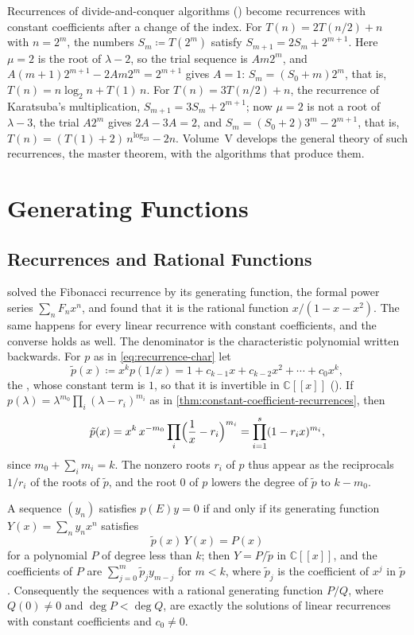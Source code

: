 Recurrences of divide-and-conquer algorithms () become recurrences with constant coefficients after a change of the index. For $T(n)=2T(n/2)+n$ with $n=2^m$, the numbers $S_m\coloneqq T(2^m)$ satisfy $S_{m+1}=2S_m+2^{m+1}$. Here $\mu=2$ is the root of $\lambda-2$, so the trial sequence is $Am2^m$, and $A(m+1)2^{m+1}-2Am2^m=2^{m+1}$ gives $A=1$: $S_m=(S_0+m)2^m$, that is, $T(n)=n\log_2n+T(1)\,n$. For $T(n)=3T(n/2)+n$, the recurrence of Karatsuba's multiplication, $S_{m+1}=3S_m+2^{m+1}$; now $\mu=2$ is not a root of $\lambda-3$, the trial $A2^m$ gives $2A-3A=2$, and $S_m=(S_0+2)3^m-2^{m+1}$, that is, $T(n)=(T(1)+2)\,n^{\log_23}-2n$. Volume~V develops the general theory of such recurrences, the master theorem, with the algorithms that produce them.

\section{Generating Functions}
\label{sec:recurrence-gf}

\subsection{Recurrences and Rational Functions}

 solved the Fibonacci recurrence by its generating function, the formal power series $\sum_nF_nx^n$, and found that it is the rational function $x/(1-x-x^2)$. The same happens for every linear recurrence with constant coefficients, and the converse holds as well. The denominator is the characteristic polynomial written backwards. For $p$ as in \eqref{eq:recurrence-char} let
\[
\tilde p(x)\coloneqq x^kp(1/x)=1+c_{k-1}x+c_{k-2}x^2+\cdots+c_0x^k ,
\]
the , whose constant term is $1$, so that it is invertible in $\mathbb C[[x]]$ (). If $p(\lambda)=\lambda^{m_0}\prod_i(\lambda-r_i)^{m_i}$ as in \cref{thm:constant-coefficient-recurrences}, then
\begin{equation}
\tilde p(x)=x^k\,x^{-m_0}\prod_i\Bigl(\frac1x-r_i\Bigr)^{m_i}=\prod_{i=1}^s(1-r_ix)^{m_i},
\label{eq:reversed-factorisation}
\end{equation}
since $m_0+\sum_im_i=k$. The nonzero roots $r_i$ of $p$ thus appear as the reciprocals $1/r_i$ of the roots of $\tilde p$, and the root $0$ of $p$ lowers the degree of $\tilde p$ to $k-m_0$.

\begin{theorem}
\label{thm:rational-gf}
A sequence $(y_n)$ satisfies $p(E)y=0$ if and only if its generating function $Y(x)=\sum_ny_nx^n$ satisfies
\[
\tilde p(x)\,Y(x)=P(x)
\]
for a polynomial $P$ of degree less than $k$; then $Y=P/\tilde p$ in $\mathbb C[[x]]$, and the coefficients of $P$ are $\sum_{j=0}^m\tilde p_jy_{m-j}$ for $m<k$, where $\tilde p_j$ is the coefficient of $x^j$ in $\tilde p$. Consequently the sequences with a rational generating function $P/Q$, where $Q(0)\ne0$ and $\deg P<\deg Q$, are exactly the solutions of linear recurrences with constant coefficients and $c_0\ne0$.
\end{theorem}

